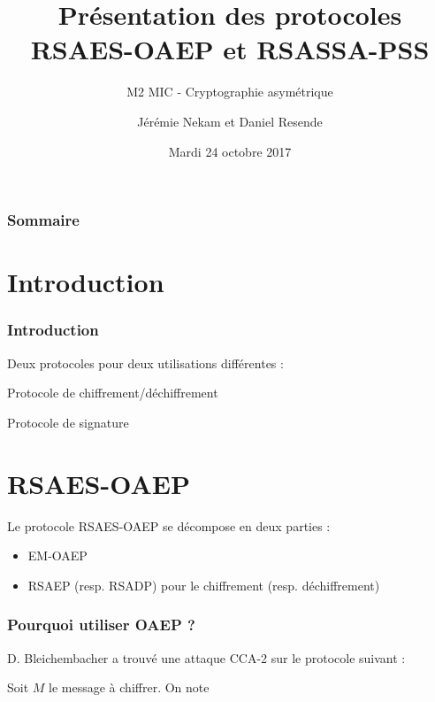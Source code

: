 \documentclass[10pt]{beamer}
\title[RSAES-OAEP et RSASSA-PSS]{Présentation des protocoles\\ RSAES-OAEP et RSASSA-PSS}
\subtitle{M2 MIC - Cryptographie asymétrique}
\author[J. Nekam et D. Resende]{Jérémie Nekam et Daniel Resende}
\institute[Paris Diderot]{\texttt{[image: upd.jpg]}}
\date{Mardi 24 octobre 2017}
\theoremstyle{plain}
\theoremstyle{definition}
\theoremstyle{remark}
\begin{document}
\frame{\titlepage}

\begin{frame}
\transwipe
\frametitle{Sommaire}
\tableofcontents[pausesections]
\end{frame}



\section{Introduction}
\begin{frame}
\frametitle{Introduction}
\transwipe
Deux protocoles pour deux utilisations différentes :
\begin{description}
\pause
\item[RSAES-OAEP] Protocole de chiffrement/déchiffrement
\pause
\item[RSASSA-PSS] Protocole de signature
\end{description}
\end{frame}
\section{RSAES-OAEP}
\begin{frame}
\transwipe
Le protocole RSAES-OAEP se décompose en deux parties :
\begin{itemize}
\item EM-OAEP
\item RSAEP (resp. RSADP) pour le chiffrement (resp. déchiffrement)
\end{itemize}
\end{frame}
\begin{frame}
\transwipe
\frametitle{Pourquoi utiliser OAEP ?}
D. Bleichembacher a trouvé une attaque CCA-2 sur le protocole suivant :

\begin{definition}[PKCS 1 v1]
Soit $M$ le message à chiffrer.
On note 
\end{definition}
\end{frame}
\end{document}
